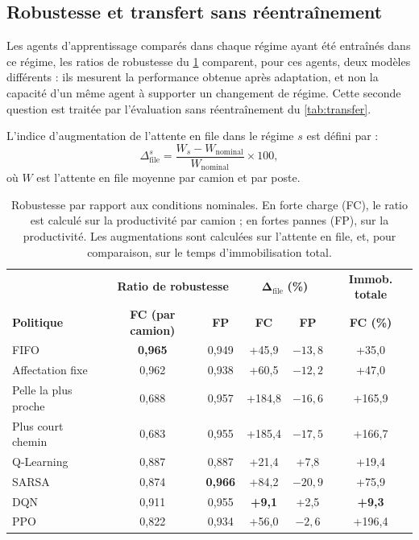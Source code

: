 \documentclass[11pt,a4paper]{article}
\newif\ifrevmarks
\newcommand{\revtag}[1]{\ifrevmarks\textsuperscript{\textcolor{red!70!black}{\scriptsize[#1]}}\fi}
\newcommand{\rev}[2]{\ifrevmarks{\color{revcolor}#2}\revtag{#1}\else#2\fi}
\newenvironment{revbloc}[1]{\par\ifrevmarks\color{revcolor}\noindent\revtag{#1}\ \fi}{\par}
\begin{document}
\subsection{Robustesse et transfert sans réentraînement}
\label{sec:robustness}

\begin{revbloc}{M1, M15, M17, QR3}
Les agents d'apprentissage comparés dans chaque régime ayant été entraînés dans ce régime, les ratios de robustesse du \cref{tab:robustness} comparent, pour ces agents, deux modèles différents : ils mesurent la performance obtenue après adaptation, et non la capacité d'un même agent à supporter un changement de régime. Cette seconde question est traitée par l'évaluation sans réentraînement du \cref{tab:transfer}.

L'indice d'augmentation de l'attente en file dans le régime $s$ est défini par :
\begin{equation}
\Delta_{\mathrm{file}}^{s} = \frac{W_{s} - W_{\mathrm{nominal}}}{W_{\mathrm{nominal}}} \times 100 ,
\label{eq:delta_wait}
\end{equation}
où $W$ est l'attente en file moyenne par camion et par poste.
\end{revbloc}

\begin{table}[H]
\centering
\caption{\rev{M15, M2, M17}{Robustesse par rapport aux conditions nominales. En forte charge (FC), le ratio est calculé sur la productivité par camion ; en fortes pannes (FP), sur la productivité. Les augmentations sont calculées sur l'attente en file, et, pour comparaison, sur le temps d'immobilisation total.}}
\label{tab:robustness}
\small
\setlength{\tabcolsep}{4pt}
\begin{tabular}{lcc|cc|c}
\toprule
 & \multicolumn{2}{c|}{\textbf{Ratio de robustesse}} & \multicolumn{2}{c|}{$\boldsymbol{\Delta_{\mathrm{file}}}$ \textbf{(\%)}} & \textbf{Immob. totale} \\
\textbf{Politique} & \textbf{FC (par camion)} & \textbf{FP} & \textbf{FC} & \textbf{FP} & \textbf{FC (\%)} \\
\midrule
FIFO                 & \textbf{0,965} & 0,949 & +45,9  & $-13{,}8$ & +35,0 \\
Affectation fixe     & 0,962 & 0,938 & +60,5  & $-12{,}2$ & +47,0 \\
Pelle la plus proche & 0,688 & 0,957 & +184,8 & $-16{,}6$ & +165,9 \\
Plus court chemin    & 0,683 & 0,955 & +185,4 & $-17{,}5$ & +166,7 \\
Q-Learning           & 0,887 & 0,887 & +21,4  & +7,8      & +19,4 \\
SARSA                & 0,874 & \textbf{0,966} & +84,2  & $-20{,}9$ & +75,9 \\
DQN                  & 0,911 & 0,955 & \textbf{+9,1} & +2,5 & \textbf{+9,3} \\
PPO                  & 0,822 & 0,934 & +56,0  & $-2{,}6$  & +196,4 \\
\bottomrule
\end{tabular}
\end{table}
\end{document}
